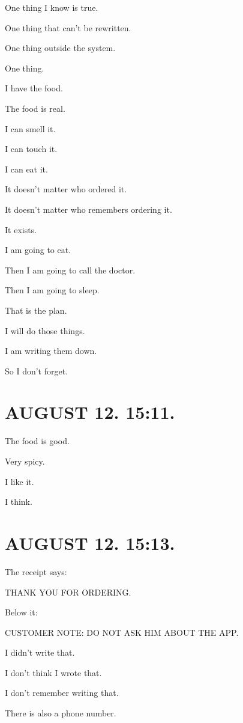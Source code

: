 \documentclass[11pt,oneside]{book}
\begin{document}
One thing I know is true.

One thing that can't be rewritten.

One thing outside the system.

One thing.

I have the food.

The food is real.

I can smell it.

I can touch it.

I can eat it.

It doesn't matter who ordered it.

It doesn't matter who remembers ordering it.

It exists.

I am going to eat.

Then I am going to call the doctor.

Then I am going to sleep.

That is the plan.

I will do those things.

I am writing them down.

So I don't forget.

\section*{AUGUST 12. 15:11.}

The food is good.

Very spicy.

I like it.

I think.

\section*{AUGUST 12. 15:13.}

The receipt says:

THANK YOU FOR ORDERING.

Below it:

CUSTOMER NOTE: DO NOT ASK HIM ABOUT THE APP.

I didn't write that.

I don't think I wrote that.

I don't remember writing that.

There is also a phone number.
\end{document}
